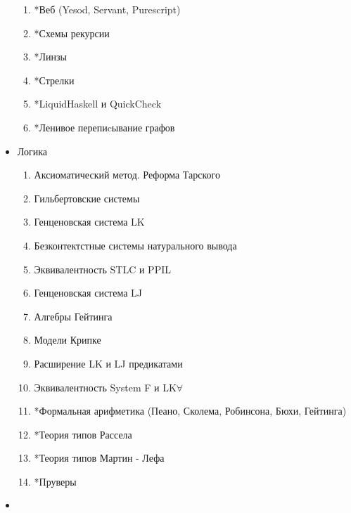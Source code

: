 \documentclass[10pt,a4paper]{article}
\theoremstyle{definition}
\begin{document}
\begin{itemize}
\begin{enumerate}
  \item *Веб (Yesod, Servant, Purescript)
  \item *Схемы рекурсии
  \item *Линзы
  \item *Стрелки
  \item *LiquidHaskell и QuickCheck
  \item *Ленивое перепиcывание графов    
  \end{enumerate}
\item Логика
  \begin{enumerate}
  \item Аксиоматический метод. Реформа Тарского
  \item Гильбертовские системы
  \item Генценовская система LK
  \item Безконтектстные системы натурального вывода
  \item Эквивалентность STLC и PPIL
  \item Генценовская система LJ
  \item Алгебры Гейтинга
  \item Модели Крипке
  \item Расширение LK и LJ предикатами
  \item Эквивалентность System F и LK$\forall$
  \item *Формальная арифметика (Пеано, Сколема, Робинсона, Бюхи, Гейтинга)
  \item *Теория типов Рассела
  \item *Теория типов Мартин - Лефа    
  \item *Пруверы
  \end{enumerate}

\item 
  
 
  
\end{itemize}
\end{document}
